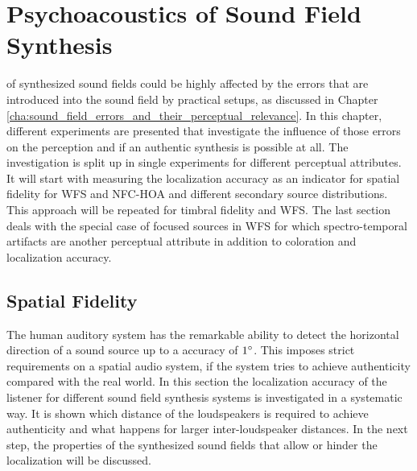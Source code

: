 \def \GITHUB {\GITHUBBASE/05_psychoacoustics}


\chapter{Psychoacoustics of Sound Field Synthesis}
\label{cha:psychoacoustics}

 of synthesized sound fields could be highly
affected by the errors that are introduced into the sound
field by practical setups, as discussed in
Chapter\,\ref{cha:sound_field_errors_and_their_perceptual_relevance}.
In this chapter, different experiments are presented that investigate
the influence of those errors on the perception and if an
authentic synthesis is possible at all. The investigation is split up in
single experiments for different perceptual attributes.
It will start with measuring the localization
accuracy as an indicator for spatial fidelity for \ac{WFS} and \ac{NFC-HOA} and
different secondary source distributions. This approach will be repeated for timbral
fidelity and \ac{WFS}.
The last section deals with the special case of focused sources in \ac{WFS} for
which spectro-temporal artifacts are another perceptual attribute in addition to
coloration and localization accuracy.


\section[Spatial Fidelity]{Spatial Fidelity\autocite[Parts of this section are published
in][]{Wierstorf2012c,Wierstorf2013}}
\label{sec:localization}

The human auditory system has the remarkable ability to detect the horizontal
direction of a sound source up to a accuracy of $1^\circ$. This imposes strict
requirements on a spatial audio system, if the system tries to achieve
authenticity
compared with the real world. In this section the localization accuracy of the
listener for different sound field synthesis systems is investigated in a
systematic way. It is shown which distance of the loudspeakers is required to
achieve authenticity and what happens for larger inter-loudspeaker
distances. In the next step, the properties of the
synthesized sound fields that allow or hinder the localization will be discussed.


